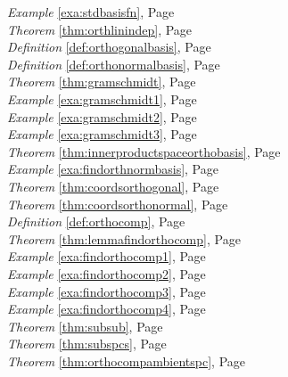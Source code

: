 \begin{multicols}{3}
\begin{center}
      \textit{Example} \ref{exa:stdbasisfn}, Page \pageref{exa:stdbasisfn} \\
      \textit{Theorem} \ref{thm:orthlinindep}, Page \pageref{thm:orthlinindep} \\
      \textit{Definition} \ref{def:orthogonalbasis}, Page \pageref{def:orthogonalbasis} \\
      \textit{Definition} \ref{def:orthonormalbasis}, Page \pageref{def:orthonormalbasis} \\
      \textit{Theorem} \ref{thm:gramschmidt}, Page \pageref{thm:gramschmidt} \\
      \textit{Example} \ref{exa:gramschmidt1}, Page \pageref{exa:gramschmidt1} \\
      \textit{Example} \ref{exa:gramschmidt2}, Page \pageref{exa:gramschmidt2} \\
      \textit{Example} \ref{exa:gramschmidt3}, Page \pageref{exa:gramschmidt3} \\
      \textit{Theorem} \ref{thm:innerproductspaceorthobasis}, Page \pageref{thm:innerproductspaceorthobasis} \\
      \textit{Example} \ref{exa:findorthnormbasis}, Page \pageref{exa:findorthnormbasis} \\
      \textit{Theorem} \ref{thm:coordsorthogonal}, Page \pageref{thm:coordsorthogonal} \\
      \textit{Theorem} \ref{thm:coordsorthonormal}, Page \pageref{thm:coordsorthonormal} \\
      \textit{Definition} \ref{def:orthocomp}, Page \pageref{def:orthocomp} \\
      \textit{Theorem} \ref{thm:lemmafindorthocomp}, Page \pageref{thm:lemmafindorthocomp} \\
      \textit{Example} \ref{exa:findorthocomp1}, Page \pageref{exa:findorthocomp1} \\
      \textit{Example} \ref{exa:findorthocomp2}, Page \pageref{exa:findorthocomp2} \\
      \textit{Example} \ref{exa:findorthocomp3}, Page \pageref{exa:findorthocomp3} \\
      \textit{Example} \ref{exa:findorthocomp4}, Page \pageref{exa:findorthocomp4} \\
      \textit{Theorem} \ref{thm:subsub}, Page \pageref{thm:subsub} \\
      \textit{Theorem} \ref{thm:subspcs}, Page \pageref{thm:subspcs} \\
      \textit{Theorem} \ref{thm:orthocompambientspc}, Page \pageref{thm:orthocompambientspc} \\

\end{center}
\end{multicols}
